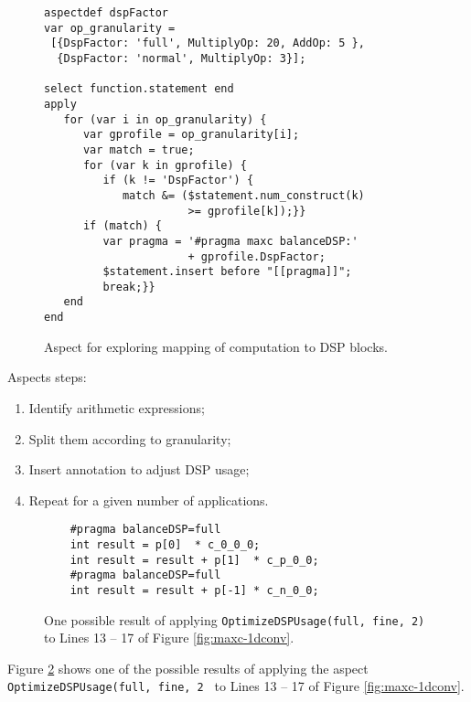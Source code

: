\lstset{style=lara}
\begin{figure}[!h]
  \centering
  \begin{lstlisting}
aspectdef dspFactor
var op_granularity =
 [{DspFactor: 'full', MultiplyOp: 20, AddOp: 5 },
  {DspFactor: 'normal', MultiplyOp: 3}];

select function.statement end
apply
   for (var i in op_granularity) {
      var gprofile = op_granularity[i];
      var match = true;
      for (var k in gprofile) {
         if (k != 'DspFactor') {
            match &= ($statement.num_construct(k)
                      >= gprofile[k]);}}
      if (match) {
         var pragma = '#pragma maxc balanceDSP:'
                      + gprofile.DspFactor;
         $statement.insert before "[[pragma]]";
         break;}}
   end
end
  \end{lstlisting}
  \caption{Aspect for exploring mapping of computation to DSP blocks.}
  \label{fig:aspect-DSP}
\end{figure}

Aspects steps:

\begin{enumerate}
\item Identify arithmetic expressions;
\item Split them according to granularity;
\item Insert annotation to adjust DSP usage;
\item Repeat for a given number of applications.
\end{enumerate}

\newsavebox{\secondlisting}
\begin{lrbox}{\secondlisting}%
  
\end{lrbox}

\begin{figure}
  \begin{lstlisting}
    #pragma balanceDSP=full
    int result = p[0]  * c_0_0_0;
    int result = result + p[1]  * c_p_0_0;
    #pragma balanceDSP=full
    int result = result + p[-1] * c_n_0_0;
  \end{lstlisting}
  \caption{One possible result of applying
    \texttt{OptimizeDSPUsage(full, fine, 2)} to Lines 13 -- 17 of Figure
    \ref{fig:maxc-1dconv}.}
  \label{fig:maxc-1dconv-aspect}
\end{figure}

Figure \ref{fig:maxc-1dconv-aspect} shows one of the possible results
of applying the aspect \texttt{OptimizeDSPUsage(full, fine, 2 } to
Lines 13 -- 17 of Figure \ref{fig:maxc-1dconv}.


